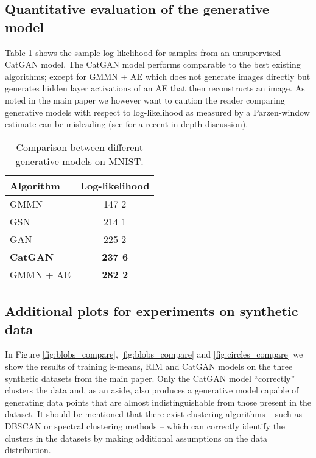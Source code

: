 \documentclass{article} \usepackage{iclr2016_conference,times}
\begin{document}
\begin{appendix}
\subsection{Quantitative evaluation of the generative model}
Table \ref{tab:ll_mnist} shows the sample log-likelihood for samples
from an unsupervised CatGAN model.  The CatGAN model performs
comparable to the best existing algorithms; except for GMMN + AE which
does not generate images directly but generates hidden layer
activations of an AE that then reconstructs an image. As noted in the
main paper we however want to caution the reader comparing generative
models with respect to log-likelihood as measured by a Parzen-window
estimate can be misleading (see \cite{Theis_2015} for a recent
in-depth discussion).

\begin{table}[h]
  \begin{center}
  \begin{tabular}{lc}
    \bf Algorithm & Log-likelihood\\
    \hline
    GMMN \citep{Li_2015} & 147  2 \\
    GSN \citep{Bengio_ICML2014} & 214  1 \\
    GAN \citep{Goodfellow_NIPS2014} & 225  2 \\
    \textbf{CatGAN} & \textbf{237  6} \\
    \hline
    GMMN + AE \citep{Li_2015} & \textbf{282  2}
  \end{tabular}
\end{center}
\caption{Comparison between different generative models on MNIST.}
\label{tab:ll_mnist}
\end{table}


\subsection{Additional plots for experiments on synthetic data}
In Figure \ref{fig:blobs_compare}, \ref{fig:blobs_compare} and
\ref{fig:circles_compare} we show the results of training k-means, RIM
and CatGAN models on the three synthetic datasets from the main
paper. Only the CatGAN model ``correctly'' clusters the data and, as
an aside, also produces a generative model capable of generating data
points that are almost indistinguishable from those present in the
dataset.  It should be mentioned that there exist clustering
algorithms -- such as DBSCAN \citep{EstKriSanXu96} or spectral clustering
methods -- which can correctly identify the clusters in the datasets
by making additional assumptions on the data distribution.


\end{appendix}
\end{document}
